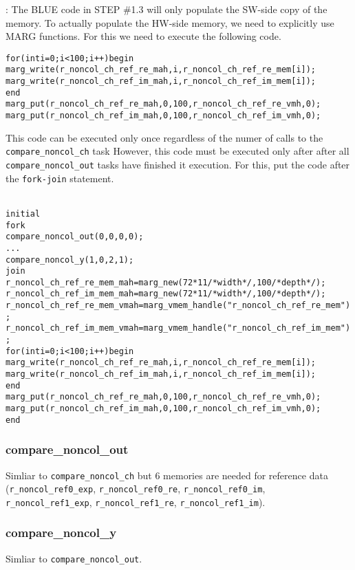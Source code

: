 \documentclass{note}
\begin{document}
  \w {}:
     The \textcolor{blue2}{BLUE} code in STEP \#1.3 will only populate the
     SW-side copy of the memory. To actually populate the HW-side memory, 
     we need to explicitly use MARG functions. For this we need to execute the
     following code.
  \begin{alltt}
  \textcolor{blue2}{for (int i = 0; i < 100; i++) begin
    marg_write(r_noncol_ch_ref_re_mah, i, r_noncol_ch_ref_re_mem[i]);
    marg_write(r_noncol_ch_ref_im_mah, i, r_noncol_ch_ref_im_mem[i]);
  end
  marg_put(r_noncol_ch_ref_re_mah, 0, 100, r_noncol_ch_ref_re_vmh, 0);
  marg_put(r_noncol_ch_ref_im_mah, 0, 100, r_noncol_ch_ref_im_vmh, 0);}
  \end{alltt}
   This code can be executed only once regardless of the numer of calls to the
   \verb+compare_noncol_ch+ task 
   \textcolor{red2}{However, this code must be executed only after
   after all {\tt{}compare\_noncol\_out} tasks have finished it execution.}
   For this, put the code after the \verb+fork-join+ statement.
  \begin{alltt}
  \textcolor{blue2}{
  initial 
    fork
      compare_noncol_out(0, 0, 0, 0);
      ...
      compare_noncol_y(1, 0, 2, 1);
    join
    r_noncol_ch_ref_re_mem_mah = marg_new(72*11/*width*/, 100 /*depth*/);
    r_noncol_ch_ref_im_mem_mah = marg_new(72*11/*width*/, 100 /*depth*/);
    r_noncol_ch_ref_re_mem_vmah = marg_vmem_handle("r_noncol_ch_ref_re_mem");
    r_noncol_ch_ref_im_mem_vmah = marg_vmem_handle("r_noncol_ch_ref_im_mem");
    for (int i = 0; i < 100; i++) begin
      marg_write(r_noncol_ch_ref_re_mah, i, r_noncol_ch_ref_re_mem[i]);
      marg_write(r_noncol_ch_ref_im_mah, i, r_noncol_ch_ref_im_mem[i]);
    end
    marg_put(r_noncol_ch_ref_re_mah, 0, 100, r_noncol_ch_ref_re_vmh, 0);
    marg_put(r_noncol_ch_ref_im_mah, 0, 100, r_noncol_ch_ref_im_vmh, 0);
  end}
  \end{alltt}
  \een
\eit
\subsubsection{compare\_noncol\_out}
\bit
\w Simliar to \verb+compare_noncol_ch+ but 6 memories are needed for reference
data (\verb+r_noncol_ref0_exp+,
              \verb+r_noncol_ref0_re+,
              \verb+r_noncol_ref0_im+,
              \verb+r_noncol_ref1_exp+,
              \verb+r_noncol_ref1_re+,
              \verb+r_noncol_ref1_im+).
\eit
\subsubsection{compare\_noncol\_y}
\bit
\w Simliar to \verb+compare_noncol_out+.
\eit
\end{document}
